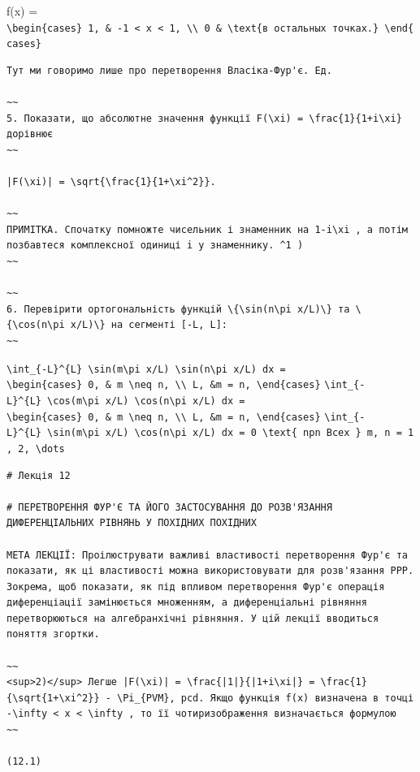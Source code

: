 \documentclass[
  ukrainian,
]{article}
\begin{document}
f(x) =
\texttt{\textbackslash{}begin\{cases\}\ 1,\ \&\ -1\ \textless{}\ x\ \textless{}\ 1,\ \textbackslash{}\textbackslash{}\ 0\ \&\ \textbackslash{}text\{в\ остальных\ точках.\}\ \textbackslash{}end\{cases\}}

\begin{verbatim}
Тут ми говоримо лише про перетворення Власіка-Фур'є. Ед.

~~
5. Показати, що абсолютне значення функції F(\xi) = \frac{1}{1+i\xi} дорівнює
~~

|F(\xi)| = \sqrt{\frac{1}{1+\xi^2}}.

~~
ПРИМІТКА. Спочатку помножте чисельник і знаменник на 1-i\xi , а потім позбавтеся комплексної одиниці i у знаменнику. ^1 )
~~

~~
6. Перевірити ортогональність функцій \{\sin(n\pi x/L)\} та \{\cos(n\pi x/L)\} на сегменті [-L, L]:
~~
\end{verbatim}

\texttt{\textbackslash{}int\_\{-L\}\^{}\{L\}\ \textbackslash{}sin(m\textbackslash{}pi\ x/L)\ \textbackslash{}sin(n\textbackslash{}pi\ x/L)\ dx\ =}
\texttt{\textbackslash{}begin\{cases\}\ 0,\ \&\ m\ \textbackslash{}neq\ n,\ \textbackslash{}\textbackslash{}\ L,\ \&m\ =\ n,\ \textbackslash{}end\{cases\}}
\texttt{\textbackslash{}int\_\{-L\}\^{}\{L\}\ \textbackslash{}cos(m\textbackslash{}pi\ x/L)\ \textbackslash{}cos(n\textbackslash{}pi\ x/L)\ dx\ =}
\texttt{\textbackslash{}begin\{cases\}\ 0,\ \&\ m\ \textbackslash{}neq\ n,\ \textbackslash{}\textbackslash{}\ L,\ \&m\ =\ n,\ \textbackslash{}end\{cases\}}
\texttt{\textbackslash{}int\_\{-L\}\^{}\{L\}\ \textbackslash{}sin(m\textbackslash{}pi\ x/L)\ \textbackslash{}cos(n\textbackslash{}pi\ x/L)\ dx\ =\ 0\ \textbackslash{}text\{\ npn\ Bcex\ \}\ m,\ n\ =\ 1,\ 2,\ \textbackslash{}dots}

\begin{verbatim}
# Лекція 12

# ПЕРЕТВОРЕННЯ ФУР'Є ТА ЙОГО ЗАСТОСУВАННЯ ДО РОЗВ'ЯЗАННЯ ДИФЕРЕНЦІАЛЬНИХ РІВНЯНЬ У ПОХІДНИХ ПОХІДНИХ

МЕТА ЛЕКЦІЇ: Проілюструвати важливі властивості перетворення Фур'є та показати, як ці властивості можна використовувати для розв'язання PPP. Зокрема, щоб показати, як під впливом перетворення Фур'є операція диференціації замінюється множенням, а диференціальні рівняння перетворюються на алгебранхічні рівняння. У цій лекції вводиться поняття згортки.

~~
<sup>2)</sup> Легше |F(\xi)| = \frac{|1|}{|1+i\xi|} = \frac{1}{\sqrt{1+\xi^2}} - \Pi_{PVM}, pcd. Якщо функція f(x) визначена в точці -\infty < x < \infty , то її чотиризображення визначається формулою
~~

(12.1)
\end{verbatim}
\end{document}

